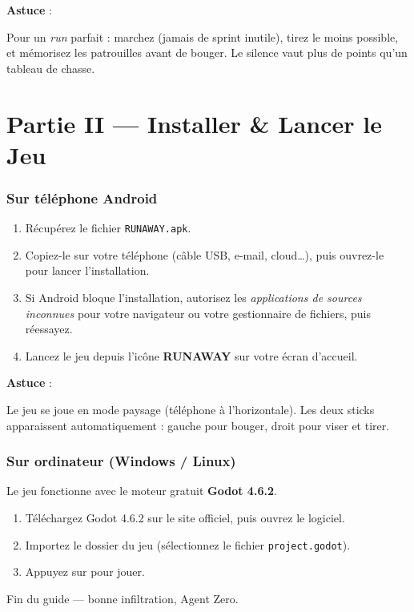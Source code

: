 \documentclass[11pt,a4paper]{article}
\newcommand{\code}[1]{\colorbox{codebg}{\texttt{#1}}}
\newcommand{\key}[1]{\fcolorbox{eclipsedark}{white}{\small\texttt{#1}}}
\newenvironment{astuce}{%
  \begin{lrbox}{\astucebox}%
  \begin{minipage}{\dimexpr0.93\linewidth-2\fboxsep}\color{eclipsedark}%
  \textbf{\textcolor{eclipsegreen}{Astuce}} :\ %
}{%
  \end{minipage}%
  \end{lrbox}%
  \begin{center}\colorbox{tipbg}{\usebox{\astucebox}}\end{center}%
}
\begin{document}
\begin{astuce}
Pour un \emph{run} parfait : marchez (jamais de sprint inutile), tirez le moins
possible, et m\'emorisez les patrouilles avant de bouger. Le silence vaut plus
de points qu'un tableau de chasse.
\end{astuce}

\newpage
\part*{Partie II --- Installer \&{} Lancer le Jeu}

\section{Sur t\'el\'ephone Android}
\begin{enumerate}[leftmargin=1.6em]
  \item R\'ecup\'erez le fichier \code{RUNAWAY.apk}.
  \item Copiez-le sur votre t\'el\'ephone (c\^able USB, e-mail, cloud\dots), puis
  ouvrez-le pour lancer l'installation.
  \item Si Android bloque l'installation, autorisez les \emph{applications de
  sources inconnues} pour votre navigateur ou votre gestionnaire de fichiers,
  puis r\'eessayez.
  \item Lancez le jeu depuis l'ic\^one \textbf{RUNAWAY} sur votre \'ecran d'accueil.
\end{enumerate}

\begin{astuce}
Le jeu se joue en mode paysage (t\'el\'ephone \`a l'horizontale). Les deux sticks
apparaissent automatiquement : gauche pour bouger, droit pour viser et tirer.
\end{astuce}

\section{Sur ordinateur (Windows / Linux)}
Le jeu fonctionne avec le moteur gratuit \textbf{Godot 4.6.2}.
\begin{enumerate}[leftmargin=1.6em]
  \item T\'el\'echargez Godot 4.6.2 sur le site officiel, puis ouvrez le logiciel.
  \item Importez le dossier du jeu (s\'electionnez le fichier \code{project.godot}).
  \item Appuyez sur \key{F5} pour jouer.
\end{enumerate}

\vfill
\begin{center}\small
\textcolor{eclipsedark}{Fin du guide --- bonne infiltration, Agent Zero.}
\end{center}
\end{document}
